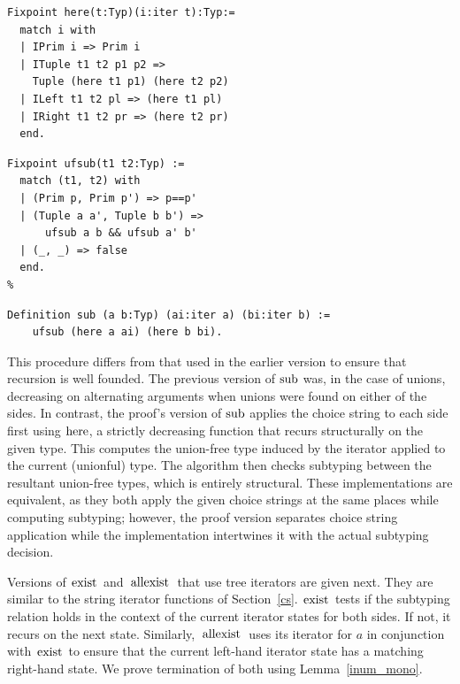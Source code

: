 \documentclass[a4paper,english]{lipics-v2019}
\renewcommand{\c}[1]{\ensuremath{\text{\lstinline{#1}}}\xspace}
\begin{document}
\medskip

\noindent
\begin{minipage}{0.53\textwidth}
\begin{lstlisting}
Fixpoint here(t:Typ)(i:iter t):Typ:=
  match i with
  | IPrim i => Prim i
  | ITuple t1 t2 p1 p2 => 
    Tuple (here t1 p1) (here t2 p2)
  | ILeft t1 t2 pl => (here t1 pl)
  | IRight t1 t2 pr => (here t2 pr)
  end.
\end{lstlisting}
\end{minipage}
\begin{minipage}{0.47\textwidth}
\begin{lstlisting}[escapechar=\%]
Fixpoint ufsub(t1 t2:Typ) :=
  match (t1, t2) with
  | (Prim p, Prim p') => p==p'
  | (Tuple a a', Tuple b b') =>
      ufsub a b && ufsub a' b'
  | (_, _) => false
  end.
%
\end{lstlisting}
\end{minipage}


\begin{lstlisting}
Definition sub (a b:Typ) (ai:iter a) (bi:iter b) :=
    ufsub (here a ai) (here b bi).
\end{lstlisting}

\noindent This procedure differs from that used in the earlier version  to
ensure that recursion is well founded. The previous version of \c{sub} was, in
the case of unions, decreasing on alternating arguments  when unions were
found on either of the sides. In contrast, the proof's version of \c{sub}
applies the choice string to each side first using \c{here}, a strictly
decreasing function that recurs structurally on the given type. This computes
the union-free type induced by the iterator applied to the current (unionful)
type. The algorithm then checks subtyping between the resultant union-free
types, which is entirely structural. These implementations are equivalent, as
they both apply the given choice strings at the same places while computing
subtyping; however, the proof version separates choice string application
while the implementation intertwines it with the actual subtyping decision.

Versions of \c{exist} and \c{allexist} that use tree iterators are given
next. They are similar to the string iterator functions of Section~\ref{cs}.
\c{exist} tests if the subtyping relation holds in the context of the
current iterator states for both sides. If not, it recurs on the next
state. Similarly, \c{allexist} uses its iterator for $a$ in conjunction with
\c{exist} to ensure that the current left-hand iterator state has a matching
right-hand state. We prove termination of both using Lemma~\ref{inum_mono}.
\end{document}
